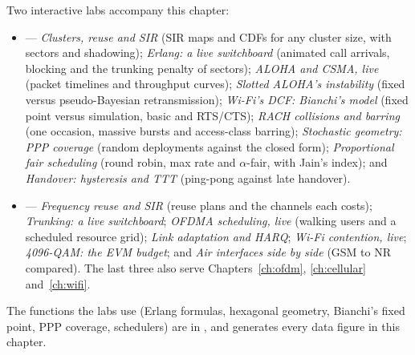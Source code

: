 \begin{labbox}
Two interactive labs accompany this chapter:
\begin{itemize}
\item {} --- \emph{Clusters, reuse and SIR} (SIR maps and CDFs for
any cluster size, with sectors and shadowing); \emph{Erlang: a live switchboard} (animated call arrivals, blocking and
the trunking penalty of sectors); \emph{ALOHA and CSMA, live} (packet timelines and throughput curves);
\emph{Slotted ALOHA's instability} (fixed versus pseudo-Bayesian retransmission); \emph{Wi-Fi's DCF: Bianchi's model}
(fixed point versus simulation, basic and RTS/CTS); \emph{RACH collisions and barring} (one occasion, massive bursts and
access-class barring); \emph{Stochastic geometry: PPP coverage} (random deployments against the closed form);
\emph{Proportional fair scheduling} (round robin, max rate and $\alpha$-fair, with Jain's index); and \emph{Handover:
hysteresis and TTT} (ping-pong against late handover).
\item {} --- \emph{Frequency reuse and SIR} (reuse plans and the
channels each costs); \emph{Trunking: a live switchboard}; \emph{OFDMA scheduling, live} (walking users and a scheduled
resource grid); \emph{Link adaptation and HARQ}; \emph{Wi-Fi contention, live}; \emph{4096-QAM: the EVM budget}; and
\emph{Air interfaces side by side} (GSM to NR compared). The last three also serve Chapters~\ref{ch:ofdm},
\ref{ch:cellular} and~\ref{ch:wifi}.
\end{itemize}
The functions the labs use (Erlang formulas, hexagonal geometry, Bianchi's fixed point, PPP coverage, schedulers) are in
, and  generates every data figure in this
chapter.
\end{labbox}

